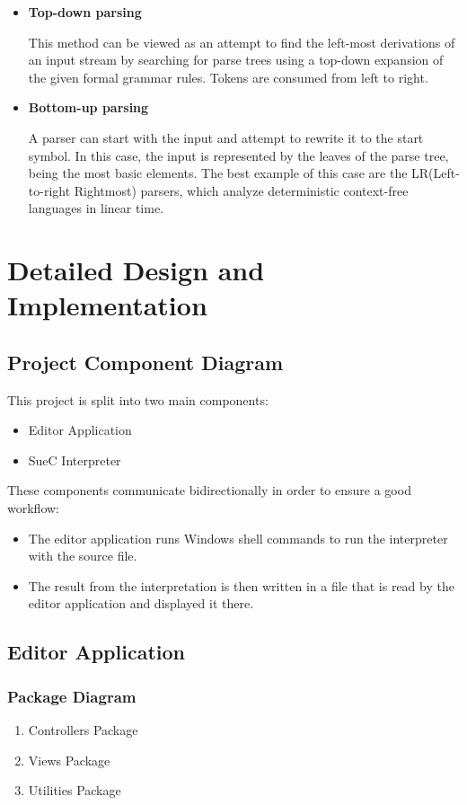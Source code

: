 \documentclass[12pt,a4paper,twoside]{report}
\begin{document}
 	\begin{itemize}
 		\item \textbf{Top-down parsing}
 		
 		This method can be viewed as an attempt to find the left-most derivations of an input stream by searching for parse trees using a top-down expansion of the given formal grammar rules. Tokens are consumed from left to right.
 		
 		\item \textbf{Bottom-up parsing}
 		
 		A parser can start with the input and attempt to rewrite it to the start symbol. In this case, the input is represented by the leaves of the parse tree, being the most basic elements. The best example of this case are the LR(Left-to-right Rightmost) parsers, which analyze deterministic context-free languages in linear time.
 	\end{itemize}

\chapter{Detailed Design and Implementation}

\section{Project Component Diagram}
This project is split into two main components:
\begin{itemize}
	\item Editor Application
	\item SueC Interpreter
\end{itemize}

These components communicate bidirectionally in order to ensure a good workflow:
\begin{itemize}
	\item The editor application runs Windows shell commands to run the interpreter with the source file.
	\item The result from the interpretation is then written in a file that is read by the editor application and displayed it there.  
\end{itemize}
\section{Editor Application}
\subsection{Package Diagram}
\begin{enumerate}
	\item Controllers Package
	\item Views Package
	\item Utilities Package
\end{enumerate}
\end{document}
